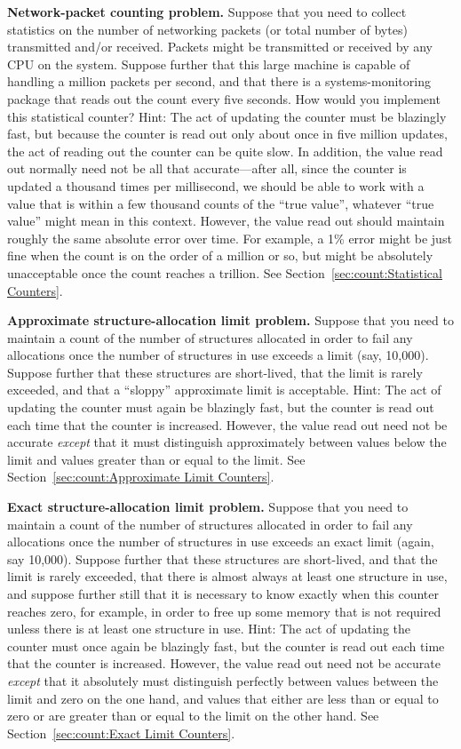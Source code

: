 \QuickQ{}
	{ \bfseries Network-packet counting problem. }
	Suppose that you need to collect statistics on the number
	of networking packets (or total number of bytes) transmitted
	and/or received.
	Packets might be transmitted or received by any CPU on
	the system.
	Suppose further that this large machine is capable of
	handling a million packets per second, and that there
	is a systems-monitoring package that reads out the count
	every five seconds.
	How would you implement this statistical counter?
\QuickA{}
	Hint: The act of updating the counter must be blazingly
	fast, but because the counter is read out only about once
	in five million updates, the act of reading out the counter can be
	quite slow.
	In addition, the value read out normally need not be all that
	accurate---after all, since the counter is updated a thousand
	times per millisecond, we should be able to work with a value
	that is within a few thousand counts of the ``true value'',
	whatever ``true value'' might mean in this context.
	However, the value read out should maintain roughly the same
	absolute error over time.
	For example, a 1\% error might be just fine when the count
	is on the order of a million or so, but might be absolutely
	unacceptable once the count reaches a trillion.
	See Section~\ref{sec:count:Statistical Counters}.

\QuickQ{}
	{ \bfseries Approximate structure-allocation limit problem. }
	Suppose that you need to maintain a count of the number of
	structures allocated in order to fail any allocations
	once the number of structures in use exceeds a limit
	(say, 10,000).
	Suppose further that these structures are short-lived,
	that the limit is rarely exceeded, and that a ``sloppy''
	approximate limit is acceptable.
\QuickA{}
	Hint: The act of updating the counter must again be blazingly
	fast, but the counter is read out each time that the
	counter is increased.
	However, the value read out need not be accurate
	\emph{except} that it must distinguish approximately
	between values below the limit and values greater than or
	equal to the limit.
	See Section~\ref{sec:count:Approximate Limit Counters}.

\QuickQ{}
	{ \bfseries Exact structure-allocation limit problem. }
	Suppose that you need to maintain a count of the number of
	structures allocated in order to fail any allocations
	once the number of structures in use exceeds an exact limit
	(again, say 10,000).
	Suppose further that these structures are short-lived,
	and that the limit is rarely exceeded, that there is almost
	always at least one structure in use, and suppose further
	still that it is necessary to know exactly when this counter reaches
	zero, for example, in order to free up some memory
	that is not required unless there is at least one structure
	in use.
\QuickA{}
	Hint: The act of updating the counter must once again be blazingly
	fast, but the counter is read out each time that the
	counter is increased.
	However, the value read out need not be accurate
	\emph{except} that it absolutely must distinguish perfectly
	between values between the limit and zero on the one hand,
	and values that either are less than or equal to zero or
	are greater than or equal to the limit on the other hand.
	See Section~\ref{sec:count:Exact Limit Counters}.


